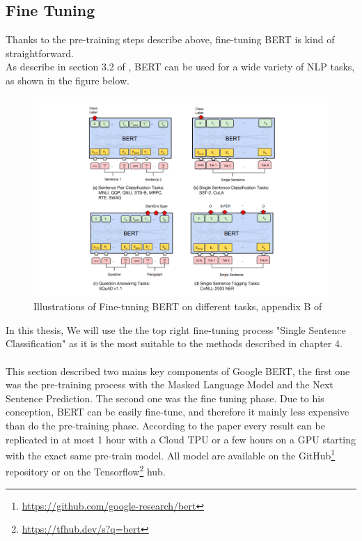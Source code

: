 \clearpage
\subsection{Fine Tuning}
Thanks to the pre-training steps describe above, fine-tuning BERT is kind of straightforward. \\
As describe in section 3.2 of \citeauthor{Devlin2018}, BERT can be used for a wide variety of NLP tasks, as shown in the figure below.

\begin{figure}[!h]
    \centering
    \includegraphics[width=1\textwidth]{bert-tasks.png}
    \caption{Illustrations of Fine-tuning BERT on different tasks, appendix B of \cite{Devlin2018}}
    \label{fig:Fine-tuning}
\end{figure}

In this thesis, We will use the the top right fine-tuning process "Single Sentence Classification" as it is the most suitable to the methods described in chapter 4.\\
\\
This section described two mains key components of Google BERT, the first one was the pre-training process with the Masked Language Model and the Next Sentence Prediction. 
The second one was the fine tuning phase. Due to his conception, BERT can be easily fine-tune, and therefore it mainly less expensive than do the pre-training phase. 
According to the paper every result can be replicated in at most 1 hour with a Cloud TPU or a few hours on a GPU starting with the exact same pre-train model. 
All model are available on the GitHub\footnote{\url{https://github.com/google-research/bert}} repository  or on the Tensorflow\footnote{\url{https://tfhub.dev/s?q=bert}} hub. 


